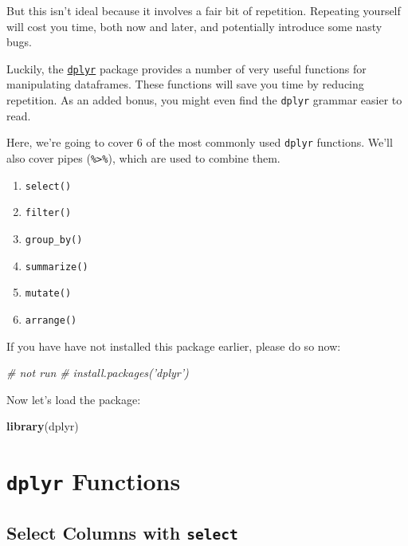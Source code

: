 \documentclass[]{book}
\newenvironment{Shaded}{\begin{snugshade}}{\end{snugshade}}
\newcommand{\KeywordTok}[1]{\textcolor[rgb]{0.13,0.29,0.53}{\textbf{#1}}}
\newcommand{\CommentTok}[1]{\textcolor[rgb]{0.56,0.35,0.01}{\textit{#1}}}
\newcommand{\NormalTok}[1]{#1}
\providecommand{\tightlist}{%
  \setlength{\itemsep}{0pt}\setlength{\parskip}{0pt}}
\begin{document}
But this isn't ideal because it involves a fair bit of repetition.
Repeating yourself will cost you time, both now and later, and
potentially introduce some nasty bugs.

Luckily, the
\href{https://cran.r-project.org/web/packages/dplyr/dplyr.pdf}{\texttt{dplyr}}
package provides a number of very useful functions for manipulating
dataframes. These functions will save you time by reducing repetition.
As an added bonus, you might even find the \texttt{dplyr} grammar easier
to read.

Here, we're going to cover 6 of the most commonly used \texttt{dplyr}
functions. We'll also cover pipes (\texttt{\%\textgreater{}\%}), which
are used to combine them.

\begin{enumerate}
\def\labelenumi{\arabic{enumi}.}
\tightlist
\item
  \texttt{select()}
\item
  \texttt{filter()}
\item
  \texttt{group\_by()}
\item
  \texttt{summarize()}
\item
  \texttt{mutate()}
\item
  \texttt{arrange()}
\end{enumerate}

If you have have not installed this package earlier, please do so now:

\begin{Shaded}
\begin{Highlighting}[]
\CommentTok{# not run}
\CommentTok{# install.packages('dplyr')}
\end{Highlighting}
\end{Shaded}

Now let's load the package:

\begin{Shaded}
\begin{Highlighting}[]
\KeywordTok{library}\NormalTok{(dplyr)}
\end{Highlighting}
\end{Shaded}

\section{\texorpdfstring{\texttt{dplyr}
Functions}{dplyr Functions}}\label{dplyr-functions}

\subsection{\texorpdfstring{Select Columns with
\texttt{select}}{Select Columns with select}}\label{select-columns-with-select}
\end{document}
